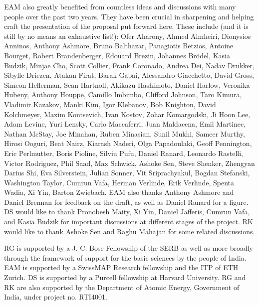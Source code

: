 \documentclass[english]{article}
\renewcommand{\>}{\rangle}
\newcommand{\<}{\langle}
\renewcommand{\(}{\left(}
\renewcommand{\)}{\right)}
\begin{document}
EAM also greatly benefited from countless ideas and discussions with many people over the past two years. They have been crucial in sharpening and helping craft the presentation of the proposal put forward here. These include (and it is still by no means an exhaustive list!): Ofer Aharony, Ahmed Almheiri, Dionysios Anninos, Anthony Ashmore, Bruno Balthazar, Panagiotis Betzios, Antoine Bourget, Robert Brandenberger, Edouard Brezin, Johannes Brödel, Kasia Budzik, Minjae Cho, Scott Collier, Frank Coronado, Andrea Dei, Nadav Drukker, Sibylle Driezen, Atakan Firat, Barak Gabai, Alessandro Giacchetto, David Gross, Simeon Hellerman, Sean Hartnoll, Akikazu Hashimoto, Daniel Harlow, Veronika Hubeny, Anthony Houppe, Camillo Imbimbo, Clifford Johnson, Taro Kimura, Vladimir Kazakov, Manki Kim, Igor Klebanov, Bob Knighton, David Kolchmeyer, Maxim Kontsevich, Ivan Kostov, Zohar Komargodski, Ji Hoon Lee, Adam Levine, Yuri Lensky, Carlo Maccaferri, Juan Maldacena, Emil Martinec, Nathan McStay, Joe Minahan, Ruben Minasian, Sunil Mukhi, Sameer Murthy, Hirosi Ooguri, Beat Nairz, Kiarash Naderi, Olga Papadoulaki, Geoff Pennington, Eric Perlmutter, Boris Pioline, Silviu Pufu, Daniel Ranard, Leonardo Rastelli, Victor Rodriguez, Phil Saad, Max Schwick, Ashoke Sen, Steve Shenker, Zhengyan Darius Shi, Eva Silverstein, Julian Sonner, Vit Sriprachyakul, Bogdan Stefanski, Washington Taylor, Cumrun Vafa, Herman Verlinde, Erik Verlinde, Spenta Wadia, Xi Yin, Barton Zwiebach. EAM also thanks Anthony Ashmore and Daniel Brennan for feedback on the draft, as well as Daniel Ranard for a figure. DS would like to thank Pronobesh Maity, Xi Yin, Daniel Jafferis, Cumrun Vafa, and Kasia Budzik for important discussions at different stages of the project. RK would like to thank Ashoke Sen and Raghu Mahajan for some related discussions.

RG is supported by a J. C. Bose Fellowship of the SERB as well as more broadly through the framework of support for the basic sciences by the people of India. 
EAM is supported by a SwissMAP Research fellowship and the ITP of ETH Zurich.
DS is supported by a Purcell fellowship at Harvard University. RG and RK are also supported by the Department of
Atomic Energy, Government of India, under project no. RTI4001.
\end{document}

